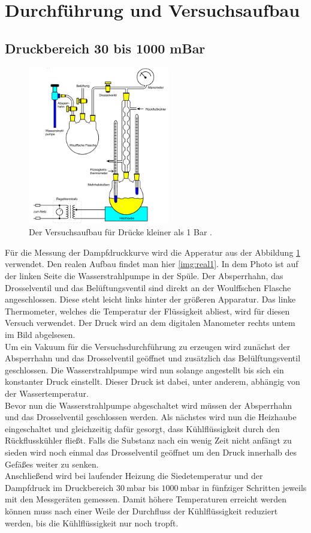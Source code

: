 \section{Durchführung und Versuchsaufbau}

\subsection{Druckbereich 30 bis 1000 mBar}
\begin{figure}[H]
    \centering
    \includegraphics[width=0.55\textwidth]{images/Abbildung3.PNG}
    \caption{Der Versuchsaufbau für Drücke kleiner als 1 Bar \protect \cite{V203}.}
    \label{img:aufbau1}
\end{figure}
Für die Messung der Dampfdruckkurve wird die Apperatur aus der Abbildung \ref{img:aufbau1} verwendet. 
Den realen Aufbau findet man hier \ref{img:real1}. In dem Photo ist auf der linken Seite die Wasserstrahlpumpe in der Spüle. 
Der Absperrhahn, das Drosselventil und das Belüftungsventil sind direkt an der Woulffschen Flasche angeschlossen. Diese steht leicht 
links hinter der größeren Apparatur. Das linke Thermometer, welches die Temperatur der Flüssigkeit abliest, wird für diesen Versuch 
verwendet. Der Druck wird an dem digitalen Manometer rechts untem im Bild abgelsesen.\\
Um ein Vakuum für die Versuchsdurchführung zu erzeugen wird zunächst der Absperrhahn und das Drosselventil geöffnet und zusätzlich das 
Belülftungsventil geschlossen. Die Wasserstrahlpumpe wird nun solange angestellt bis sich ein konstanter Druck einstellt. 
Dieser Druck ist dabei, unter anderem, abhängig von der Wassertemperatur.\\
Bevor nun die Wasserstrahlpumpe abgeschaltet wird müssen der Absperrhahn und das Drosselventil geschlossen werden. 
Als nächstes wird nun die Heizhaube eingeschaltet und gleichzeitig dafür gesorgt, dass Kühlflüssigkeit durch den Rückflusskühler fließt. 
Falls die Substanz nach ein wenig Zeit nicht anfängt zu sieden wird noch einmal das Drosselventil geöffnet um den Druck innerhalb des Gefäßes weiter zu senken.\\
Anschließend wird bei laufender Heizung die Siedetemperatur und der Dampfdruck im Druckbereich $\SI{30}{\milli\bar}$ bis $\SI{1000}{\milli\bar}$ 
in fünfziger Schritten jeweils mit den Messgeräten gemessen. Damit höhere Temperaturen erreicht werden können 
muss nach einer Weile der Durchfluss der Kühlflüssigkeit reduziert werden, bis die Kühlflüssigkeit nur noch tropft.
